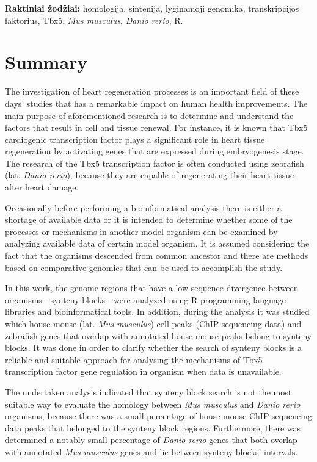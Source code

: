 \documentclass[12pt]{article}
\begin{document}
\hfill \break

\textbf{Raktiniai žodžiai:} homologija, sintenija, lyginamoji genomika,
transkripcijos faktorius, Tbx5, \emph{Mus musculus}, \emph{Danio rerio}, R.

\newpage


\section*{Summary}
The investigation of heart regeneration processes is an important field of
these days' studies that has a remarkable impact on human health improvements.
The main purpose of aforementioned research is to determine and understand the
factors that result in cell and tissue renewal. For instance, it is known that
Tbx5 cardiogenic transcription factor plays a significant role in heart tissue
regeneration by activating genes that are expressed during embryogenesis stage.
The research of the Tbx5 transcription factor is often conducted using 
zebrafish (lat. \emph{Danio rerio}), because they are capable of regenerating
their heart tissue after heart damage.

Occasionally before performing a bioinformatical analysis there is either
a shortage of available data or it is intended to determine whether some of the
processes or mechanisms in another model organism can be examined by analyzing
available data of certain model organism. It is assumed considering the fact
that the organisms descended from common ancestor and there are methods based
on comparative genomics that can be used to accomplish the study.

In this work, the genome regions that have a low sequence divergence between
organisms - synteny blocks - were analyzed using R programming language
libraries and bioinformatical tools. In addition, during the analysis it was
studied which house mouse (lat. \emph{Mus musculus}) cell peaks (ChIP sequencing
data) and zebrafish genes that overlap with annotated house mouse peaks belong
to synteny blocks. It was done in order to clarify whether the search of synteny
blocks is a reliable and suitable approach for analysing the mechanisms of Tbx5
transcription factor gene regulation in organism when data is unavailable.

The undertaken analysis indicated that synteny block search is not the most
suitable way to evaluate the homology between \emph{Mus musculus} and
\emph{Danio rerio} organisms, because there was a small percentage of house
mouse ChIP sequencing data peaks that belonged to the synteny block regions.
Furthermore, there was determined a notably small percentage of
\emph{Danio rerio} genes that both overlap with annotated \emph{Mus musculus}
genes and lie between synteny blocks' intervals.
\end{document}
